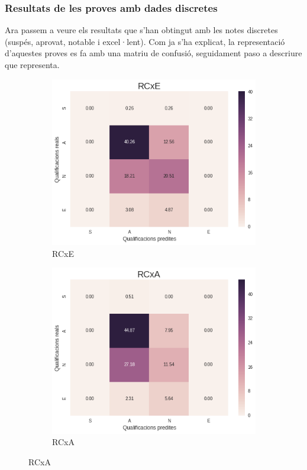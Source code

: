 \documentclass[12pt,a4paper,catalan]{article}
\begin{document}
\newpage

\subsubsection{Resultats de les proves amb dades discretes}

Ara passem a veure els resultats que s'han obtingut amb les notes discretes (suspés, aprovat, notable i excel·lent). Com ja s'ha explicat, la representació d'aquestes proves es fa amb una matriu de confusió, seguidament paso a descriure que representa.

\begin{figure}[h]
\centering
\begin{subfigure}{.48\textwidth}
  \centering
  \includegraphics[width=\linewidth]{img/heatmap_rcxe_primer_segon.png}
  \caption{RCxE}
\end{subfigure}
\begin{subfigure}{.48\textwidth}
  \centering
  \includegraphics[width=\linewidth]{img/heatmap_rcxa_primer_segon.png}
  \caption{RCxA}
\end{subfigure}
\end{figure}
\end{document}
